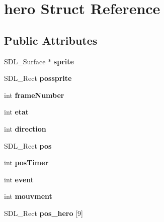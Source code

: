 \hypertarget{structhero}{}\section{hero Struct Reference}
\label{structhero}
\subsection*{Public Attributes}
\begin{DoxyCompactItemize}
\item 
\mbox{\label{structhero_a983d5dd611b38115f1b9177fb1e54bff}} 
S\+D\+L\+\_\+\+Surface $\ast$ {\bfseries sprite}
\item 
\mbox{\label{structhero_a45947b3c9db48dca2a272da9da75a429}} 
S\+D\+L\+\_\+\+Rect {\bfseries possprite}
\item 
\mbox{\label{structhero_af6bf9a5c08ae7e3c064b57a5e8e5fe64}} 
int {\bfseries frame\+Number}
\item 
\mbox{\label{structhero_aa628c0174ff3d1942273de389c7cfae9}} 
int {\bfseries etat}
\item 
\mbox{\label{structhero_a362c6e74cce0d52538c606ba7b05a50f}} 
int {\bfseries direction}
\item 
\mbox{\label{structhero_a194cbf9b9821cedf4708160c8fb186dd}} 
S\+D\+L\+\_\+\+Rect {\bfseries pos}
\item 
\mbox{\label{structhero_adf2bf13fce1ffbfa00d89e62b8801cb3}} 
int {\bfseries pos\+Timer}
\item 
\mbox{\label{structhero_ad7320fdd471b66b068b981534a5052b1}} 
int {\bfseries event}
\item 
\mbox{\label{structhero_a2e29e9bbf40ce21c919020cab377c459}} 
int {\bfseries mouvment}
\item 
\mbox{\label{structhero_aab81ceea7ebb9ebef12093f1d39f3fab}} 
S\+D\+L\+\_\+\+Rect {\bfseries pos\+\_\+hero} \mbox{[}9\mbox{]}
\item 
\mbox{\label{structhero_af2fb6a94961c732b5a29e58a86983aa6}} 

\end{DoxyCompactItemize}
